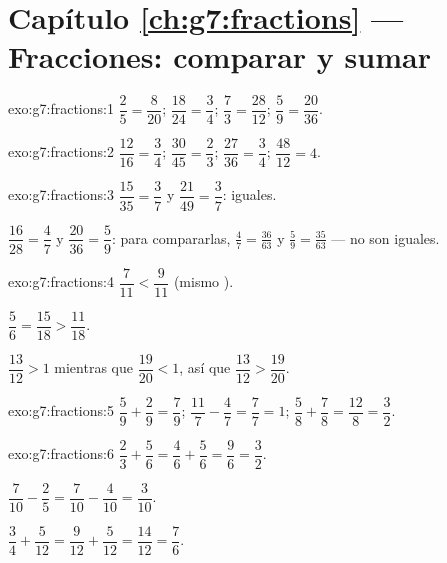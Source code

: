 \section*{Capítulo \ref{ch:g7:fractions} --- Fracciones: comparar y sumar}

\begin{solution}{exo:g7:fractions:1}
$\dfrac{2}{5} = \dfrac{8}{20}$; \quad
$\dfrac{18}{24} = \dfrac{3}{4}$; \quad
$\dfrac{7}{3} = \dfrac{28}{12}$; \quad
$\dfrac{5}{9} = \dfrac{20}{36}$.
\end{solution}

\begin{solution}{exo:g7:fractions:2}
$\dfrac{12}{16} = \dfrac34$; \quad
$\dfrac{30}{45} = \dfrac23$; \quad
$\dfrac{27}{36} = \dfrac34$; \quad
$\dfrac{48}{12} = 4$.
\end{solution}

\begin{solution}{exo:g7:fractions:3}
$\dfrac{15}{35} = \dfrac37$ y $\dfrac{21}{49} = \dfrac37$: iguales.

$\dfrac{16}{28} = \dfrac47$ y $\dfrac{20}{36} = \dfrac59$: para
compararlas, $\frac47 = \frac{36}{63}$ y $\frac59 = \frac{35}{63}$ ---
no son iguales.
\end{solution}

\begin{solution}{exo:g7:fractions:4}
$\dfrac{7}{11} < \dfrac{9}{11}$ (mismo ).

$\dfrac56 = \dfrac{15}{18} > \dfrac{11}{18}$.

$\dfrac{13}{12} > 1$ mientras que $\dfrac{19}{20} < 1$, así que
$\dfrac{13}{12} > \dfrac{19}{20}$.
\end{solution}

\begin{solution}{exo:g7:fractions:5}
$\dfrac59 + \dfrac29 = \dfrac79$; \quad
$\dfrac{11}{7} - \dfrac47 = \dfrac77 = 1$; \quad
$\dfrac58 + \dfrac78 = \dfrac{12}{8} = \dfrac32$.
\end{solution}

\begin{solution}{exo:g7:fractions:6}
$\dfrac23 + \dfrac56 = \dfrac46 + \dfrac56 = \dfrac96 = \dfrac32$.

$\dfrac{7}{10} - \dfrac25 = \dfrac{7}{10} - \dfrac{4}{10} =
\dfrac{3}{10}$.

$\dfrac34 + \dfrac{5}{12} = \dfrac{9}{12} + \dfrac{5}{12} =
\dfrac{14}{12} = \dfrac76$.
\end{solution}

